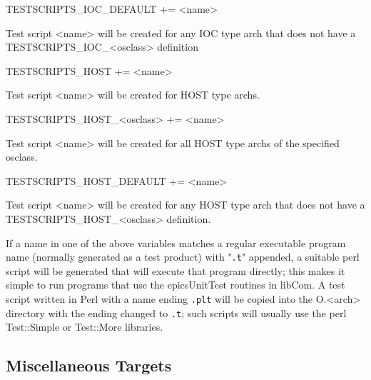 \begin{description}\item TESTSCRIPTS\_IOC\_DEFAULT += \textless{}name\textgreater{}

\end{description}Test script \textless{}name\textgreater{} will be created for any IOC type arch that does not have a 
TESTSCRIPTS\_IOC\_\textless{}osclass\textgreater{} definition



\begin{description}\item {}TESTSCRIPTS\_HOST += \textless{}name\textgreater{}

\end{description}Test script \textless{}name\textgreater{} will be created for HOST type archs.

\begin{description}\item TESTSCRIPTS\_HOST\_\textless{}osclass\textgreater{} += \textless{}name\textgreater{}

\end{description}Test script \textless{}name\textgreater{} will be created for all HOST type archs of the specified osclass.

\begin{description}\item TESTSCRIPTS\_HOST\_DEFAULT += \textless{}name\textgreater{}

\end{description}Test script \textless{}name\textgreater{} will be created for any HOST type arch that does not have a 
TESTSCRIPTS\_HOST\_\textless{}osclass\textgreater{} definition.

If a name in one of the above variables matches a regular executable program name (normally generated as a test product) 
with "\verb|.t|" appended, a suitable perl script will be generated that will execute that program directly; this makes it simple to 
run programs that use the epicsUnitTest routines in libCom.  A test script written in Perl with a name ending \verb|.plt| will be 
copied into the O.\textless{}arch\textgreater{} directory with the ending changed to \verb|.t|; such scripts will usually use the perl Test::Simple or 
Test::More libraries.

\subsection{Miscellaneous Targets}


